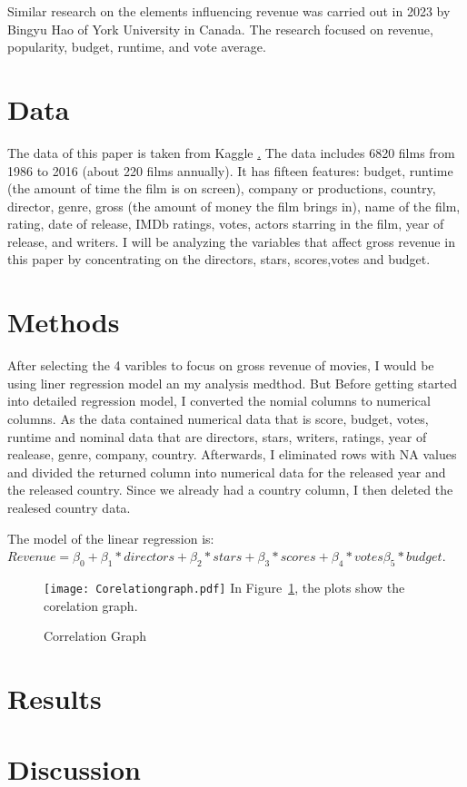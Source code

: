 \documentclass[12pt]{article}
\begin{document}
Similar research on the elements influencing revenue  was carried out in 2023 by Bingyu Hao 
of York University in Canada. The research focused on revenue, popularity, budget, runtime, and vote average.

\section{Data}
\label{sec:data}

The data of this paper is taken from Kaggle \href{https://www.kaggle.com/datasets/danielgrijalvas/movies}. 
The data includes 6820 films from 1986 to 2016 (about 220 films annually). It has
fifteen features: budget, runtime (the amount of time the film is on screen), company 
or productions, country, director, genre, gross (the amount of money the film brings in), 
name of the film, rating, date of release, IMDb ratings, votes, actors starring in the
film, year of release, and writers. I will be analyzing the variables that affect
gross revenue in this paper by concentrating on the directors, stars, scores,votes and budget.

\section{Methods}
\label{sec:meth}

After selecting the 4 varibles to focus on gross revenue of movies, I would be using
liner regression model an my analysis medthod. But Before getting started into detailed 
regression model, I converted the nomial columns to numerical columns. As the data contained 
numerical data that is score, budget, votes, runtime and nominal data that are directors, 
stars, writers, ratings, year of realease, genre, company, country. Afterwards, I eliminated
rows with NA values and divided the returned column into numerical data for the released 
year and the released country. Since we already had a country column, I then deleted the 
realesed country data.

The model of the linear regression is:
$Revenue = \beta_0 +\beta_1*directors + \beta_2*stars + \beta_3*scores + \beta_4*votes \beta_5*budget$.

\begin{figure}
	\caption{Correlation Graph}
	\texttt{[image: Corelationgraph.pdf]}
	\label{fig:Correlationgraph}
In Figure~\ref{fig:Correlationgraph}, the plots show the corelation graph.
\end{figure}

\section{Results}
\label{sec:res}




\section{Discussion}
\label{sec:dis}





\end{document}

